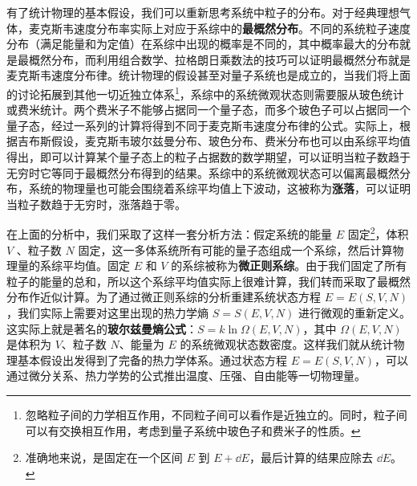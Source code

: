 有了统计物理的基本假设，我们可以重新思考系统中粒子的分布。对于经典理想气体，麦克斯韦速度分布率实际上对应于系综中的\textbf{最概然分布}。不同的系统粒子速度分布（满足能量和为定值）在系综中出现的概率是不同的，其中概率最大的分布就是最概然分布，而利用组合数学、拉格朗日乘数法的技巧可以证明最概然分布就是麦克斯韦速度分布律。统计物理的假设甚至对量子系统也是成立的，当我们将上面的讨论拓展到其他一切近独立体系\footnote{忽略粒子间的力学相互作用，不同粒子间可以看作是近独立的。同时，粒子间可以有交换相互作用，考虑到量子系统中玻色子和费米子的性质。}，系综中的系统微观状态则需要服从玻色统计或费米统计。两个费米子不能够占据同一个量子态，而多个玻色子可以占据同一个量子态，经过一系列的计算将得到不同于麦克斯韦速度分布律的公式。实际上，根据吉布斯假设，麦克斯韦玻尔兹曼分布、玻色分布、费米分布也可以由系综平均值得出，即可以计算某个量子态上的粒子占据数的数学期望，可以证明当粒子数趋于无穷时它等同于最概然分布得到的结果。系综中的系统微观状态可以偏离最概然分布，系统的物理量也可能会围绕着系综平均值上下波动，这被称为\textbf{涨落}，可以证明当粒子数趋于无穷时，涨落趋于零。

在上面的分析中，我们采取了这样一套分析方法：假定系统的能量 $E$ 固定\footnote{准确地来说，是固定在一个区间 $E$ 到 $E+\dd E$，最后计算的结果应除去 $\dd E$。}，体积 $V$ 、粒子数 $N$ 固定，这一多体系统所有可能的量子态组成一个系综，然后计算物理量的系综平均值。固定 $E$ 和 $V$ 的系综被称为\textbf{微正则系综}。由于我们固定了所有粒子的能量的总和，所以这个系综平均值实际上很难计算，我们转而采取了最概然分布作近似计算。为了通过微正则系综的分析重建系统状态方程 $E=E(S,V,N)$，我们实际上需要对这里出现的热力学熵 $S=S(E,V,N)$ 进行微观的重新定义。这实际上就是著名的\textbf{玻尔兹曼熵公式}：$S=k\ln \Omega(E,V,N)$，其中 $\Omega(E,V,N)$ 是体积为 $V$、粒子数 $N$、能量为 $E$ 的系统微观状态数密度。这样我们就从统计物理基本假设出发得到了完备的热力学体系。通过状态方程 $E=E(S,V,N)$，可以通过微分关系、热力学势的公式推出温度、压强、自由能等一切物理量。

